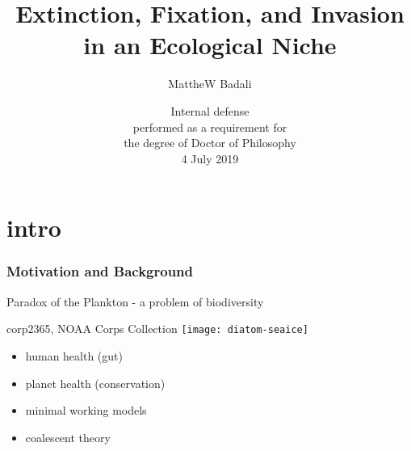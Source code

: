 \documentclass{beamer}
\title[Coexistence and Extinction of Competing Species]{Extinction, Fixation, and Invasion in an Ecological Niche}
\author[M.A.Badali]{MattheW Badali}
\date[04/07/2019]{Internal defense\\
	performed as a requirement for\\
	the degree of Doctor of Philosophy\\
	4 July 2019}
\begin{document}
\frame{\titlepage}


\iffalse
\begin{frame}
\frametitle{Table of Contents}
\begin{itemize}
	\item Introduction
	\item Extinction - Single Logistic System%
	\item Fixation - Coupled Logistic System%
	\item Invasion - Coupled Logistic System%
	\item Maintenance - Moran with Immigration
	\item Discussion
\end{itemize}
\end{frame}
\fi


\section[Introduction]{intro}

\begin{frame}
\frametitle{Motivation and Background}
Paradox of the Plankton - a problem of biodiversity
\begin{center}
\tiny{corp2365, NOAA Corps Collection}
\texttt{[image: diatom-seaice]}
\end{center}
\pause
\begin{itemize}
	\item human health (gut)
	\item planet health (conservation)
	\item minimal working models
	\item coalescent theory
\end{itemize}
\end{frame}

\iffalse
\begin{frame}
\frametitle{Motivation and Background}
\begin{itemize}
	\item Competitive Exclusion
	\begin{itemize}
		\item ecological niche
	\end{itemize}
	\pause
	\item Biodiversity
	\begin{itemize}
		\item as measured by abundance curve or number of species
	\end{itemize}
	\pause
	\item Niche models vs Neutral models
\end{itemize}
\end{frame}
\fi
\end{document}
